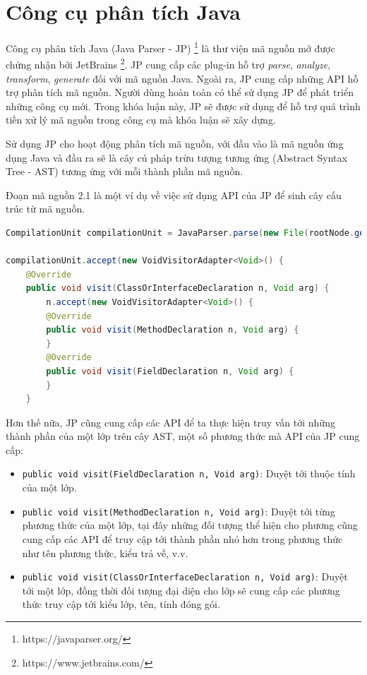 \documentclass[12pt]{report}
\begin{document}
\section{Công cụ phân tích Java}
Công cụ phân tích Java (Java Parser - JP) \footnote{https://javaparser.org/} là thư viện mã nguồn mở được chứng nhận bởi JetBrains \footnote{https://www.jetbrains.com/}. JP cung cấp các plug-in hỗ trợ \textit{parse}, \textit{analyze}, \textit{transform}, \textit{generate } đối với mã nguồn Java. Ngoài ra, JP cung cấp những API hỗ trợ phân tích mã nguồn. Người dùng hoàn toàn có thể sử dụng JP để phát triển những công cụ mới. Trong khóa luận này, JP sẽ được sử dụng để hỗ trợ quá trình tiền xử lý mã nguồn trong công cụ mà khóa luận sẽ xây dựng.

\noindent Sử dụng JP cho hoạt động phân tích mã nguồn, với đầu vào là mã nguồn ứng dụng Java và đầu ra sẽ là cây cú pháp trừu tượng tương ứng (Abstract Syntax Tree - AST) tương ứng với mỗi thành phần mã nguồn.

\noindent Đoạn mã nguồn 2.1 là một ví dụ về việc sử dụng API của  JP để sinh cây cấu trúc từ mã nguồn. 
\newpage
\begin{lstlisting}[language=Java,
caption={Sử dụng API của JavaParser để sinh cây cú pháp trừu tượng từ mã nguồn},label={code:jdt-ast-gen}]
CompilationUnit compilationUnit = JavaParser.parse(new File(rootNode.getAbsolutePath()));

compilationUnit.accept(new VoidVisitorAdapter<Void>() {
	@Override
	public void visit(ClassOrInterfaceDeclaration n, Void arg) {
		n.accept(new VoidVisitorAdapter<Void>() {
		@Override
		public void visit(MethodDeclaration n, Void arg) {
		}
		@Override
		public void visit(FieldDeclaration n, Void arg) {
		}
	}
\end{lstlisting}
Hơn thế nữa, JP cũng cung cấp các API để ta thực hiện truy vấn tới những thành phần của một lớp trên cây AST, một số phương thức mà API của JP cung cấp:
\begin{itemize}
	\item \texttt{public void visit(FieldDeclaration n, Void arg)}: Duyệt tới thuộc tính của một lớp.
	\item \texttt{public void visit(MethodDeclaration n, Void arg)}: Duyệt tới từng phương thức của một lớp, tại đây những đối tượng thể hiện cho phương cũng cung cấp các API để truy cập tới thành phần nhỏ hơn trong phương thức như tên phương thức, kiểu trả về, v.v.
	\item \texttt{public void visit(ClassOrInterfaceDeclaration n, Void arg)}: Duyệt tới một lớp, đồng thời đối tượng đại diện cho lớp sẽ cung cấp các phương thức truy cập tới kiểu lớp, tên, tính đóng gói.
\end{itemize}
\end{document}
